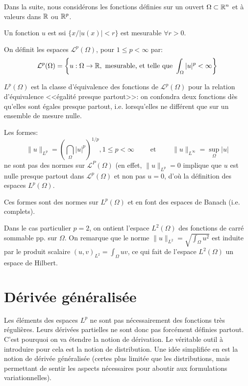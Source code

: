 Dans la suite, nous considérons les fonctions définies sur un ouvert $\Omega\subset\mathbb R^n$ et à
valeurs dans $\mathbb R$ ou $\mathbb R^p$.

Un fonction $u$ est  ssi $\{x/ |u(x)|<r\}$ est mesurable $\forall r>0$.

On définit les espaces $\mathscr{L}^p(\Omega)$, pour $1\le p<\infty$ par:
\[
\mathcal{L}^p(\Omega)=\left\{u:\Omega\rightarrow\mathbb R, \text{ mesurable, et telle que }
\displaystyle\int_\Omega|u|^p<\infty\right\}
\]

\medskip
$L^p(\Omega)$ est la classe d'équivalence des fonctions de $\mathscr{L}^ p(\Omega)$ 
pour la relation d'équivalence <<égalité presque partout>>: on confondra deux fonctions 
dès qu'elles sont égales presque partout, i.e. lorsqu'elles ne différent que sur un ensemble
de mesure nulle.

Les formes:
\[
\|u\|_{L^p}=\left(\dint_\Omega |u|^p\right)^{1/p}, 1\le p<\infty \qquad \text{ et }
\qquad \|u\|_{L^\infty}=\sup_\Omega |u|
\]
ne sont pas des normes sur $\mathscr{L}^P(\Omega)$
(en effet, $\|u\|_{L^p}=0$ implique que $u$ est nulle presque partout dans $\mathscr{L}^p(\Omega)$
et non pas $u = 0$, d'où la définition des espaces $L^p(\Omega)$.

Ces formes sont des normes sur $L^p(\Omega)$ et en font des espaces de Banach (i.e. complets).

\medskip
Dans le cas particulier $p=2$, on ontient l'espace $L^2(\Omega)$ des fonctions de carré 
sommable pp. sur $\Omega$. On remarque que le norme $\|u\|_{L^2}=\sqrt{\int_\Omega u^2}$
est induite par le produit scalaire $(u,v)_{L^2}=\int_\Omega uv$, ce qui fait de
l'espace $L^2(\Omega)$ un espace de Hilbert.





\medskip
\section*{Dérivée généralisée}

Les éléments des espaces $L^p$ ne sont pas nécessairement des fonctions très régulières.
Leurs dérivées partielles ne sont donc pas forcément définies partout.
C'est pourquoi on va étendre la notion de dérivation. 
Le véritable outil à introduire pour cela est la notion de distribution.
Une idée simplifiée en est la notion de dérivée généralisée (certes  plus limitée que
les distributions, mais permettant de sentir les aspects nécessaires pour aboutir aux formulations
variationnelles).

